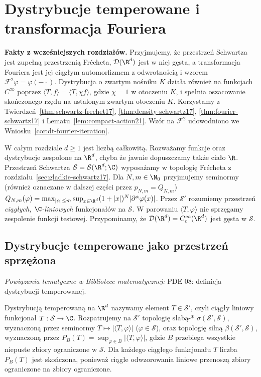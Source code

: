 
\section{Dystrybucje temperowane i transformacja Fouriera}
\label{sec:temperowane22}

\providecommand{\atlasref}[2]{#2}


\noindent\textbf{Fakty z wcześniejszych rozdziałów.}
Przyjmujemy, że przestrzeń Schwartza jest zupełną przestrzenią Frécheta,
$\mathcal D(\R^d)$ jest w niej gęsta, a transformacja Fouriera
jest jej ciągłym automorfizmem z odwrotnością i wzorem
$\mathcal F^2\varphi=\varphi(-\cdot)$.
Dystrybucja o zwartym nośniku $K$ działa również na funkcjach
$C^\infty$ poprzez $\langle T,f\rangle=\langle T,\chi f\rangle$,
gdzie $\chi=1$ w otoczeniu $K$, i spełnia oszacowanie
skończonego rzędu na ustalonym zwartym otoczeniu $K$.
Korzystamy z Twierdzeń~\ref{thm:schwartz-frechet17},
\ref{thm:density-schwartz17}, \ref{thm:fourier-schwartz17}
i Lematu~\ref{lem:compact-action21}. Wzór na $\mathcal F^2$
udowodniono we Wniosku~\ref{cor:dt-fourier-iteration}.

W całym rozdziale $d\ge1$ jest liczbą całkowitą.
Rozważamy funkcje oraz dystrybucje zespolone na $\R^d$,
chyba że jawnie dopuszczamy także ciało $\R$.
Przestrzeń Schwartza $\mathcal S=\mathcal S(\R^d;\C)$
wyposażamy w topologię Frécheta z rozdziału~\ref{sec:gladkie-schwartz17}.
Dla $N,m\in\N_0$ przyjmujemy seminormy (również oznaczane
w dalszej części przez $p_{N,m}=Q_{N,m}$)
$Q_{N,m}(\varphi)=\max_{|\alpha|\le m}\sup_{x\in\R^d}
(1+|x|)^N|\partial^\alpha\varphi(x)|$.
Przez $\mathcal S'$ rozumiemy przestrzeń \emph{ciągłych,
$\C$-liniowych} funkcjonałów na $\mathcal S$.
W parowaniu $\langle T,\varphi\rangle$ nie sprzęgamy zespolenie
funkcji testowej. Przypominamy, że
$\mathcal D(\R^d)=C_c^\infty(\R^d)$ jest gęsta w $\mathcal S$.

\subsection{Dystrybucje temperowane jako przestrzeń sprzężona}

\noindent\emph{Powiązania tematyczne w Bibliotece matematycznej:} \atlasref{PDE-08::def:pde8-tempered}{PDE-08: definicja dystrybucji temperowanej}.


\begin{definicja}
\label{def:tempered22}
Dystrybucją temperowaną na $\R^d$ nazywamy element
$T\in\mathcal S'$, czyli ciągły liniowy funkcjonał
$T:\mathcal S\to\C$. Rozpatrujemy na $\mathcal S'$ topologię
słabą-* $\sigma(\mathcal S',\mathcal S)$, wyznaczoną przez
seminormy $T\mapsto|\langle T,\varphi\rangle|$
($\varphi\in\mathcal S$), oraz topologię silną
$\beta(\mathcal S',\mathcal S)$, wyznaczoną przez
$P_B(T)=\sup_{\varphi\in B}|\langle T,\varphi\rangle|$,
gdzie $B$ przebiega wszystkie niepuste zbiory ograniczone w $\mathcal S$.
Dla każdego ciągłego funkcjonału $T$ liczba $P_B(T)$
jest skończona, ponieważ ciągłe odwzorowania liniowe
przenoszą zbiory ograniczone na zbiory ograniczone.
\end{definicja}

